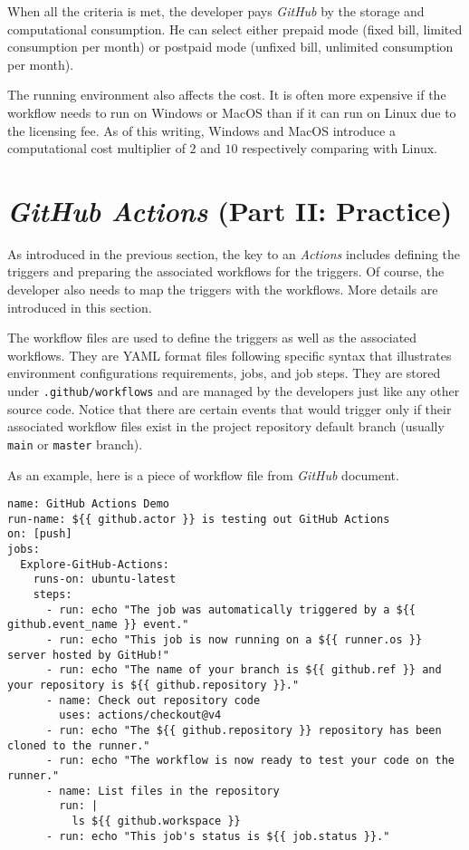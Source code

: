 When all the criteria is met, the developer pays \textit{GitHub} by the storage and computational consumption. He can select either prepaid mode (fixed bill, limited consumption per month) or postpaid mode (unfixed bill, unlimited consumption per month).

The running environment also affects the cost. It is often more expensive if the workflow needs to run on Windows or MacOS than if it can run on Linux due to the licensing fee. As of this writing, Windows and MacOS introduce a computational cost multiplier of $2$ and $10$ respectively comparing with Linux.

\section{\textit{GitHub Actions} (Part II: Practice)}

As introduced in the previous section, the key to an \textit{Actions} includes defining the triggers and preparing the associated workflows for the triggers. Of course, the developer also needs to map the triggers with the workflows. More details are introduced in this section.

The workflow files are used to define the triggers as well as the associated workflows. They are YAML format files following specific syntax that illustrates environment configurations requirements, jobs, and job steps. They are stored under \verb|.github/workflows| and are managed by the developers just like any other source code. Notice that there are certain events that would trigger only if their associated workflow files exist in the project repository default branch (usually \verb|main| or \verb|master| branch).

As an example, here is a piece of workflow file from \textit{GitHub} document. \label{code:githubactionsdemo}
\begin{lstlisting}
name: GitHub Actions Demo
run-name: ${{ github.actor }} is testing out GitHub Actions
on: [push]
jobs:
  Explore-GitHub-Actions:
    runs-on: ubuntu-latest
    steps:
      - run: echo "The job was automatically triggered by a ${{ github.event_name }} event."
      - run: echo "This job is now running on a ${{ runner.os }} server hosted by GitHub!"
      - run: echo "The name of your branch is ${{ github.ref }} and your repository is ${{ github.repository }}."
      - name: Check out repository code
        uses: actions/checkout@v4
      - run: echo "The ${{ github.repository }} repository has been cloned to the runner."
      - run: echo "The workflow is now ready to test your code on the runner."
      - name: List files in the repository
        run: |
          ls ${{ github.workspace }}
      - run: echo "This job's status is ${{ job.status }}."
\end{lstlisting}

